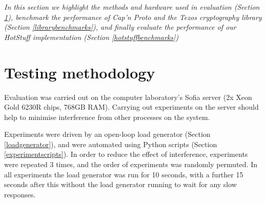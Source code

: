 



\textit{In this section we highlight the methods and hardware used in evaluation (Section \ref{testingmethods}), benchmark the performance of Cap'n Proto and the Tezos cryptography library (Section \ref{librarybenchmarks}), and finally evaluate the performance of our HotStuff implementation (Section \ref{hotstuffbenchmarks})}

\section{Testing methodology} \label{testingmethods}
Evaluation was carried out on the computer laboratory's Sofia server (2x Xeon Gold 6230R chips, 768GB RAM). Carrying out experiments on the server should help to minimise interference from other processes on the system.

Experiments were driven by an open-loop load generator (Section \ref{loadgenerator}), and were automated using Python scripts (Section \ref{experimentscripts}). In order to reduce the effect of interference, experiments were repeated 3 times, and the order of experiments was randomly permuted. In all experiments the load generator was run for 10 seconds, with a further 15 seconds after this without the load generator running to wait for any slow responses.


